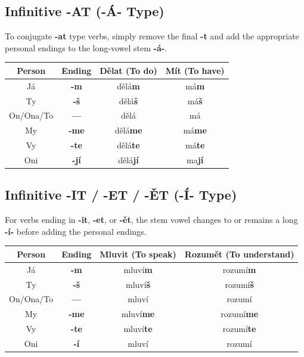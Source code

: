 \subsection{Infinitive -AT (-Á- Type)}
To conjugate \textbf{-at} type verbs, simply remove the final \textbf{-t} and add the appropriate personal endings to the long-vowel stem \textbf{-á-}.
\begin{center}
\begin{tabular}{c|c|c|c}
\hline
    \textbf{Person} & \textbf{Ending} & \textbf{Dělat (To do)} & \textbf{Mít (To have)} \\ \hline
    Já & \textbf{-m} & dělá\textbf{m} & má\textbf{m} \\
    Ty & \textbf{-š} & dělá\textbf{š} & má\textbf{š} \\
    On/Ona/To & \textbf{---} & dělá & má \\ \hline
    My & \textbf{-me} & dělá\textbf{me} & má\textbf{me} \\
    Vy & \textbf{-te} & dělá\textbf{te} & má\textbf{te} \\
    Oni & \textbf{-jí} & dělá\textbf{jí} & ma\textbf{jí} \\ \hline
\end{tabular}
\end{center}

\subsection{Infinitive -IT / -ET / -ĚT (-Í- Type)}
For verbs ending in \textbf{-it}, \textbf{-et}, or \textbf{-ět}, the stem vowel changes to or remains a long \textbf{-í-} before adding the personal endings.
\begin{center}
\begin{tabular}{c|c|c|c}
\hline
    \textbf{Person} & \textbf{Ending} & \textbf{Mluvit (To speak)} & \textbf{Rozumět (To understand)} \\ \hline
    Já & \textbf{-m} & mluví\textbf{m} & rozumí\textbf{m} \\
    Ty & \textbf{-š} & mluví\textbf{š} & rozumí\textbf{š} \\
    On/Ona/To & \textbf{---} & mluví & rozumí \\ \hline
    My & \textbf{-me} & mluví\textbf{me} & rozumí\textbf{me} \\
    Vy & \textbf{-te} & mluví\textbf{te} & rozumí\textbf{te} \\
    Oni & \textbf{-í} & mluví & rozumí \\ \hline
\end{tabular}
\end{center}

